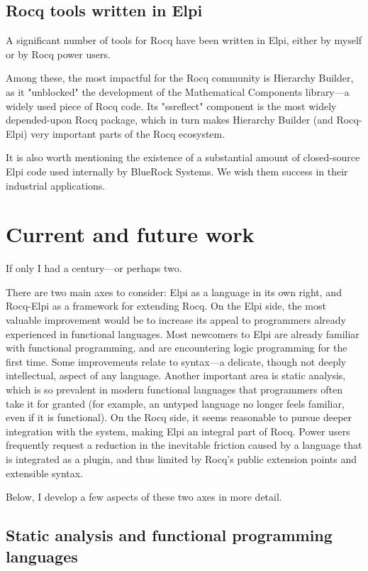 \documentclass[a4paper, 11pt]{book}
\begin{document}
\subsection{Rocq tools written in Elpi}

A significant number of tools for Rocq have been written in Elpi, either by myself or by Rocq power users.

Among these, the most impactful for the Rocq community is Hierarchy Builder, as it "unblocked" the development of the Mathematical Components library—a widely used piece of Rocq code. Its "ssreflect" component is the most widely depended-upon Rocq package, which in turn makes Hierarchy Builder (and Rocq-Elpi) very important parts of the Rocq ecosystem.

It is also worth mentioning the existence of a substantial amount of closed-source Elpi code used internally by BlueRock Systems. We wish them success in their industrial applications.

\section{Current and future work}

If only I had a century—or perhaps two. 

There are two main axes to consider:
Elpi as a language in its own right, and Rocq-Elpi as a framework for extending
Rocq. On the Elpi side, the most valuable improvement would be to increase its
appeal to programmers already experienced in functional languages. Most
newcomers to Elpi are already familiar with functional programming, and are
encountering logic programming for the first time. Some improvements relate to
syntax—a delicate, though not deeply intellectual, aspect of any language.
Another important area is static analysis, which is so prevalent in modern
functional languages that programmers often take it for granted (for example,
an untyped language no longer feels familiar, even if it is functional). On the
Rocq side, it seems reasonable to pursue deeper integration with the system,
making Elpi an integral part of Rocq. Power users frequently request a
reduction in the inevitable friction caused by a language that is integrated as
a plugin, and thus limited by Rocq’s public extension points and extensible
syntax.

Below, I develop a few aspects of these two axes in more detail.

\subsection{Static analysis and functional programming languages} 
\end{document}
